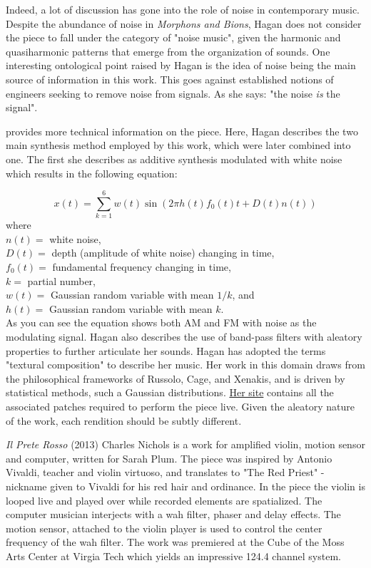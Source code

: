 Indeed, a lot of discussion has gone into the role of noise in contemporary music. Despite the abundance of noise in \textit{Morphons and Bions}, Hagan does not consider the piece to fall under the category of "noise music", given the harmonic and quasiharmonic patterns that emerge from the organization of sounds. One interesting ontological point raised by Hagan is the idea of noise being the main source of information in this work. This goes against established notions of engineers seeking to remove noise from signals. As she says: "the noise \textit{is} the signal". 

\cite{hagan2017textural} provides more technical information on the piece. Here, Hagan describes the two main synthesis method employed by this work, which were later combined into one. The first she describes as additive synthesis modulated with white noise which results in the following equation:

$$
x(t)=\sum_{k=1}^{6} w(t) \sin \left(2 \pi h(t) f_{0}(t) t+D(t) n(t)\right)
$$
where \\
$n(t)=$ white noise, \\
$D(t)=$ depth (amplitude of white noise) changing in time, \\ 
$f_{0}(t)=$ fundamental frequency changing in time, \\
$k=$ partial number, \\
$w(t)=$ Gaussian random variable with mean $1 / k$, and \\
$h(t)=$ Gaussian random variable with mean $k$.\\

As you can see the equation shows both AM and FM with noise as the modulating signal. Hagan also describes the use of band-pass filters with aleatory properties to further articulate her sounds. Hagan has adopted the terms "textural composition" to describe her music. Her work in this domain draws from the philosophical frameworks of Russolo, Cage, and Xenakis, and is driven by statistical methods, such a Gaussian distributions. \href{http://www.kerrylhagan.net/#m&b}{Her site} contains all the associated patches required to perform the piece live. Given the aleatory nature of the work, each rendition should be subtly different.


\textit{Il Prete Rosso} (2013) Charles Nichols is a work for amplified violin, motion sensor and computer, written for Sarah Plum. The piece was inspired by Antonio Vivaldi, teacher and violin virtuoso, and translates to "The Red Priest" - nickname given to Vivaldi for his red hair and ordinance. In the piece the violin is looped live and played over while recorded elements are spatialized. The computer musician interjects with a wah filter, phaser and delay effects. The motion sensor, attached to the violin player is used to control the center frequency of the wah filter. The work was premiered at the Cube of the Moss Arts Center at Virgia Tech which yields an impressive 124.4 channel system.

